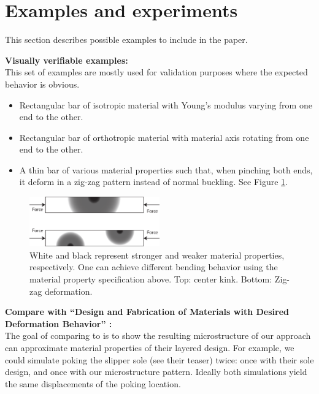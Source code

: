 \section{Examples and experiments}
\label{sec:examples}
This section describes possible examples to include in the paper.
\begin{description}
\item{\bf Visually verifiable examples:}\\
This set of examples are mostly used for validation purposes where the expected
behavior is obvious.
\begin{itemize}
    \item Rectangular bar of isotropic material with Young's modulus varying from one end
        to the other.
    \item Rectangular bar of orthotropic material with material axis rotating
        from one end to the other.
    \item A thin bar of various material properties such that, when pinching both
    ends, it deform in a zig-zag pattern instead of normal buckling. See Figure
    \ref{fig:zig_zag_bar}.
\end{itemize}
\begin{figure}
\centering
\includegraphics[width=0.5\textwidth]{images/zig_zag_bar}
\caption{White and black represent stronger and weaker material properties,
    respectively. One can achieve different bending behavior using the
material property specification above.  Top: center kink.  Bottom: Zig-zag
deformation.}
\label{fig:zig_zag_bar}
\end{figure}

\item{\bf Compare with ``Design and Fabrication of Materials with Desired
Deformation Behavior'' \cite{Bickel2010}:}\\
The goal of comparing to \cite{Bickel2010} is to show the resulting
microstructure of our approach can approximate material properties of their
layered design.  For example, we could simulate poking the slipper sole (see
their teaser) twice: once with their sole design, and once with our
microstructure pattern.  Ideally both simulations yield the same displacements
of the poking location.


\end{description}
